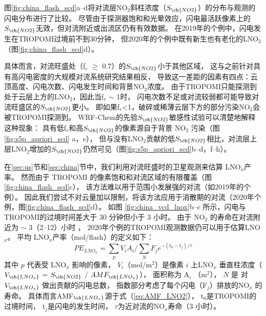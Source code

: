图\ref{fig:china_flash_scd}a--d将对流层NO$_2$斜柱浓度（$S_{\ch{NO2}}$）的分布与观测的闪电分布进行了比较。
尽管由于探测器饱和和光晕效应，闪电最活跃像素上的$S_{\ch{NO2}}$无效，但对流附近或出流区仍有有效数据。
在2019年的个例中，闪电发生在TROPOMI过境前不到30分钟，
但2020年的个例中既有新生也有老化的LNO$_2$（图\ref{fig:china_flash_scd}d）。

具体而言，对流旺盛处（f$_r$ $\geq$ 0.7）的$S_{\ch{NO2}}$小于其他区域，
这与之前针对具有高闪电密度的大规模对流系统研究结果相反\citep{Beirle.2009}，
导致这一差距的因素有四点：云顶高度、闪电次数、闪电发生时间和背景NO$_2$浓度。
由于TROPOMI只能探测到处于云层上方的LNO$_2$，因此当f$_r$ $\sim$ 1时，
闪电次数不足或对流较弱都可能导致对流旺盛区的$S_{\ch{NO2}}$更小。
即如果f$_r$<1，破碎或稀薄云层下方的部分污染NO$_2$会被TROPOMI探测到。
WRF-Chem的先验$S_{\ch{NO2}}$敏感性试验可以清楚地解释这种现象：
具有低f$_r$和高$S_{\ch{NO2}}$的像素源自于背景 NO$_2$ 污染（图\ref{fig:s5p_apriori_scd} a，e），
但与没有LNO$_2$贡献的低$S_{\ch{NO2}}$相比，对流层上层LNO$_2$增加的$S_{\ch{NO2}}$仍然可见（图\ref{fig:s5p_apriori_scd}b--d，f--h）。


在\ref{sec:us}节和\ref{sec:china}节中，我们利用对流旺盛时的卫星观测来估算 LNO$_x$产率。
然而由于 TROPOMI 的像素饱和和对流区域的有限覆盖（图\ref{fig:china_flash_scd}c），
该方法难以用于范围小发展强的对流（如2019年的个例）。
因此我们尝试不对云量加以限制，将该方法应用于消散期的对流（2020年个例，图\ref{fig:china_flash_scd}d）。
如图 \ref{fig:china_vcd_lnox}b--c 所示，闪电与TROPOMI的过境时间差大于 30 分钟但小于 3 小时。
由于 NO$_2$ 的寿命在对流附近为 $\sim$ 3（2--12）小时 \citep{Nault.2016}，
2020年个例的TROPOMI观测数据仍可以用于估算LNO$_x$。
平均 LNO$_x$产率（mol/flash）的定义如下：
\begin{equation} \label{eq:lnox}
PE_{LNO_x} = \sum_{p} V_i A_i / \sum_{N} F_j e^{-(t_0 - t_j) / \tau}
\end{equation}
其中 $p$ 代表受 LNO$_x$ 影响的像素，
$V_i$（mol/m$^2$）是像素 $i$ 上LNO$_x$ 垂直柱浓度（$V_{\ch{LNO_x}}$ = $S_{\ch{NO2}}$ / $AMF_{\ch{LNO_x}}$），
面积称为 A$_i$ （m$^2$），
$N$ 是 对 $V_{\ch{LNO_x}}$ 做出贡献的闪电总数，
指数部分考虑了每个闪电（F$_j$）排放的NO$_x$ 的寿命。
具体而言AMF$_{\ch{LNO_x}}$源于式（\ref{eq:AMF_LNO2}），
t$_0$是TROPOMI的过境时间，
t$_j$是闪电的发生时间，
$\tau$为近对流的NO$_x$寿命（3 小时）。


